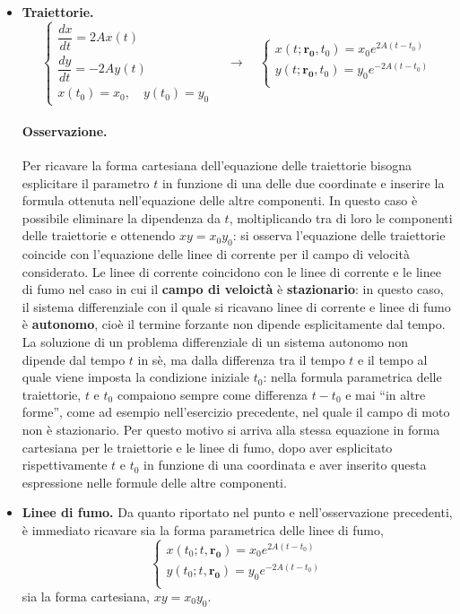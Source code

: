 \begin{itemize}
\item \textbf{Traiettorie.}
\begin{equation}
 \begin{cases}
  \dfrac{dx}{dt} = 2 A x(t) \\
  \dfrac{dy}{dt} = -  2 A y(t) \\
  x(t_0) = x_0 , \quad y(t_0) = y_0
 \end{cases}
 \quad\rightarrow\quad
 \begin{cases}
  x(t;\bm{r_0},t_0) = x_0 e^{2A(t-t_0)} \\
  y(t;\bm{r_0},t_0) = y_0 e^{-2A(t-t_0)} \\
 \end{cases}
\end{equation}
\paragraph{Osservazione.} Per ricavare la forma cartesiana dell'equazione delle traiettorie bisogna esplicitare il parametro $t$ in funzione di una delle due coordinate e inserire la formula ottenuta nell'equazione delle altre componenti. In questo caso è possibile eliminare la dipendenza da $t$, moltiplicando tra di loro le componenti delle traiettorie e ottenendo $x y = x_0 y_0$: si osserva l'equazione delle traiettorie coincide con l'equazione delle linee di corrente per il campo di velocità considerato.
Le linee di corrente coincidono con le linee di corrente e le linee di fumo nel caso in cui il \textbf{campo di veloictà} è \textbf{stazionario}: in questo caso, il sistema differenziale con il quale si ricavano linee di corrente e linee di fumo è \textbf{autonomo}, cioè il termine forzante non dipende esplicitamente dal tempo. La soluzione di un problema differenziale di un sistema autonomo non dipende dal tempo $t$ in sè, ma dalla differenza tra il tempo $t$ e il tempo al quale viene imposta la condizione iniziale $t_0$: nella formula parametrica delle traiettorie, $t$ e $t_0$ compaiono sempre come differenza $t-t_0$ e mai ``in altre forme'', come ad esempio nell'esercizio precedente, nel quale il campo di moto non è stazionario. Per questo motivo si arriva alla stessa equazione in forma cartesiana per le traiettorie e le linee di fumo, dopo aver esplicitato rispettivamente $t$ e $t_0$ in funzione di una coordinata e aver inserito questa espressione nelle formule delle altre componenti.

\item \textbf{Linee di fumo.} Da quanto riportato nel punto e nell'osservazione precedenti, è immediato ricavare sia la forma parametrica delle linee di fumo,
\begin{equation}
 \begin{cases}
  x(t_0;t,\bm{r_0}) = x_0 e^{2A(t-t_0)} \\
  y(t_0;t,\bm{r_0}) = y_0 e^{-2A(t-t_0)} \\
 \end{cases}
\end{equation}
sia la forma cartesiana, $ x y = x_0 y_0$.



\end{itemize}





